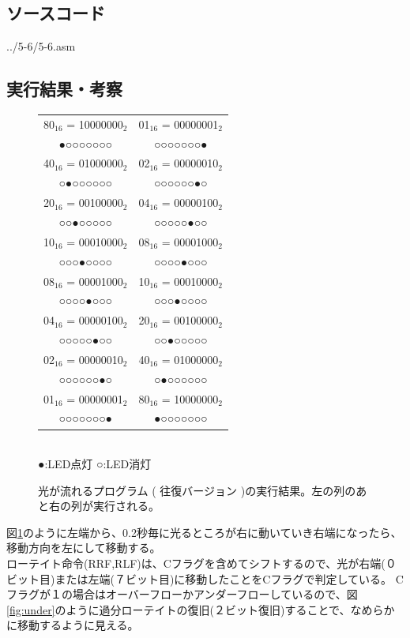 \documentclass[a4paper,12pt]{ujarticle}
\begin{document}
  \subsection{ソースコード}
   \begin{lstinputlisting}[basicstyle=\ttfamily\footnotesize, frame=single,numbers=left]
   {../5-6/5-6.asm}
   \end{lstinputlisting}
   \subsection{実行結果・考察}
   \begin{figure}[htbp]
    \begin{center}
     \begin{tabular}{c|c}
      {80}$_{16}$ = 10000000$_2$ & {01}$_{16}$  = 00000001$_2$ \\
      ●○○○○○○○            & ○○○○○○○● \\
      {40}$_{16}$ = 01000000$_2$ & {02}$_{16}$  = 00000010$_2$ \\
      ○●○○○○○○            & ○○○○○○●○ \\
      {20}$_{16}$ = 00100000$_2$ & {04}$_{16}$  = 00000100$_2$ \\
      ○○●○○○○○            & ○○○○○●○○ \\
      {10}$_{16}$ = 00010000$_2$ & {08}$_{16}$  = 00001000$_2$ \\
      ○○○●○○○○            & ○○○○●○○○ \\
      {08}$_{16}$  = 00001000$_2$ & {10}$_{16}$ = 00010000$_2$ \\
      ○○○○●○○○            & ○○○●○○○○ \\
      {04}$_{16}$  = 00000100$_2$ & {20}$_{16}$ = 00100000$_2$ \\
      ○○○○○●○○            & ○○●○○○○○ \\
      {02}$_{16}$  = 00000010$_2$ & {40}$_{16}$ = 01000000$_2$ \\
      ○○○○○○●○            & ○●○○○○○○ \\
      {01}$_{16}$  = 00000001$_2$ & {80}$_{16}$ = 10000000$_2$ \\
      ○○○○○○○●            & ●○○○○○○○ \\
     \end{tabular}\\
     ●:LED点灯 ○:LED消灯
     \caption{光が流れるプログラム ( 往復バージョン )の実行結果。左の列のあと右の列が実行される。}
     \label{fig:out_5-6}
    \end{center}
   \end{figure}
   図\ref{fig:out_5-6}のように左端から、0.2秒毎に光るところが右に動いていき右端になったら、移動方向を左にして移動する。
   \\
   ローテイト命令(RRF,RLF)は、Cフラグを含めてシフトするので、光が右端(０ビット目)または左端(７ビット目)に移動したことをCフラグで判定している。
   Cフラグが１の場合はオーバーフローかアンダーフローしているので、図\ref{fig:under}のように過分ローテイトの復旧(２ビット復旧)することで、なめらかに移動するように見える。
\end{document}
